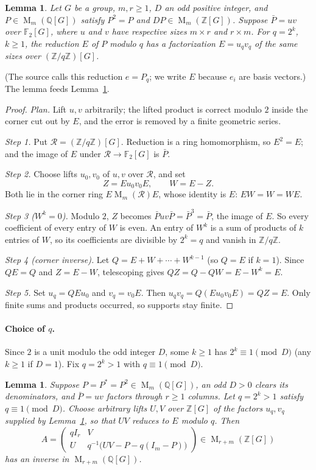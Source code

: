 \documentclass[11pt]{article}
\newtheorem{lemma}[theorem]{Lemma}
\theoremstyle{remark}
\numberwithin{equation}{section}
\newcommand{\F}{\mathbb F}
\newcommand{\Z}{\mathbb Z}
\newcommand{\Q}{\mathbb Q}
\newcommand{\Mat}{\operatorname{M}}
\begin{document}
\begin{lemma}\label{lem:lift}
Let $G$ be a group, $m,r\ge1$, $D$ an odd positive integer, and $P\in\Mat_m(\Q[G])$ satisfy $P^2=P$ and $DP\in\Mat_m(\Z[G])$. Suppose $\bar P=uv$ over $\F_2[G]$, where $u$ and $v$ have respective sizes $m\times r$ and $r\times m$. For $q=2^k$, $k\ge1$, the reduction $E$ of $P$ modulo $q$ has a factorization $E=u_qv_q$ of the same sizes over $(\Z/q\Z)[G]$.
\end{lemma}

(The source calls this reduction $e=P_q$; we write $E$ because $e_i$ are basis vectors.) The lemma feeds Lemma~\ref{lem:integral}.

\begin{proof}
\emph{Plan.} Lift $u,v$ arbitrarily; the lifted product is correct modulo $2$ inside the corner cut out by $E$, and the error is removed by a finite geometric series.

\emph{Step 1.} Put $\mathcal R=(\Z/q\Z)[G]$. Reduction is a ring homomorphism, so $E^2=E$; and the image of $E$ under $\mathcal R\to\F_2[G]$ is $\bar P$.

\emph{Step 2.} Choose lifts $u_0,v_0$ of $u,v$ over $\mathcal R$, and set
\[
 Z=Eu_0v_0E,\qquad W=E-Z.
\]
Both lie in the corner ring $E\Mat_m(\mathcal R)E$, whose identity is $E$: $EW=W=WE$.

\emph{Step 3 ($W^k=0$).} Modulo $2$, $Z$ becomes $\bar Puv\bar P=\bar P^3=\bar P$, the image of $E$. So every coefficient of every entry of $W$ is even. An entry of $W^k$ is a sum of products of $k$ entries of $W$, so its coefficients are divisible by $2^k=q$ and vanish in $\Z/q\Z$.

\emph{Step 4 (corner inverse).} Let $Q=E+W+\cdots+W^{k-1}$ (so $Q=E$ if $k=1$). Since $QE=Q$ and $Z=E-W$, telescoping gives $QZ=Q-QW=E-W^k=E$.

\emph{Step 5.} Set $u_q=QEu_0$ and $v_q=v_0E$. Then $u_qv_q=Q(Eu_0v_0E)=QZ=E$. Only finite sums and products occurred, so supports stay finite.
\end{proof}

\paragraph{Choice of $q$.}
Since $2$ is a unit modulo the odd integer $D$, some $k\ge1$ has $2^k\equiv1\pmod D$ (any $k\ge1$ if $D=1$). Fix $q=2^k>1$ with $q\equiv1\pmod D$.

\begin{lemma}\label{lem:integral}
Suppose $P=P^*=P^2\in\Mat_m(\Q[G])$, an odd $D>0$ clears its denominators, and $\bar P=uv$ factors through $r\ge1$ columns. Let $q=2^k>1$ satisfy $q\equiv1\pmod D$. Choose arbitrary lifts $U,V$ over $\Z[G]$ of the factors $u_q,v_q$ supplied by Lemma~\ref{lem:lift}, so that $UV$ reduces to $E$ modulo $q$. Then
\begin{equation}\label{eq:integral-matrix}
 A=\begin{pmatrix}
 qI_r&V\\
 U&q^{-1}\bigl(UV-P-q(I_m-P)\bigr)
 \end{pmatrix}
 \in\Mat_{r+m}(\Z[G])
\end{equation}
has an inverse in $\Mat_{r+m}(\Q[G])$.
\end{lemma}
\end{document}
